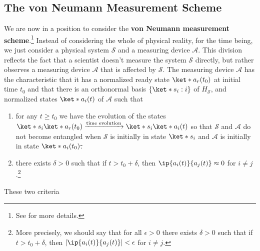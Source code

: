 \documentclass[12pt]{report}
\providecommand{\DIFadd}[1]{{\protect\color{blue}\uwave{#1}}} %
\providecommand{\DIFdel}[1]{{\protect\color{red}\sout{#1}}}                      %
\providecommand{\DIFaddbegin}{} %
\providecommand{\DIFaddend}{} %
\providecommand{\DIFdelbegin}{} %
\providecommand{\DIFdelend}{} %
\begin{document}
    
    \subsection{The von Neumann Measurement Scheme}\label{vonNeumannMeasurement}
    \addtocounter{footnote}{-1}
    \addtocounter{footnote}{1}

    We are now in a position to consider the \textbf{von Neumann measurement scheme}.\footnote{See \cite[50-53]{Schlosshauer} for more details.} Instead of considering the whole of physical reality, for the time being, we just consider a physical system $\mathcal{S}$ and a measuring device $\mathcal{A}$.  %
%
    This division reflects the fact that a scientist doesn't measure the system $\mathcal{S}$ directly, but rather observes a measuring device $\mathcal{A}$ that is affected by $\mathcal{S}$. The measuring device $\mathcal{A}$ has the characteristic that it has a normalized ready state $\ket*{a_r(t_0)}$   %
%
    at initial time $t_0$ and that there is an orthonormal basis $\{\ket*{s_i}:i\}$ of $H_\mathcal{S}$, and normalized states $\ket*{a_i(t)}$ of $\mathcal{A}$ such that
    \begin{enumerate}[noitemsep, nosep, topsep=0pt] 
    \item for any $t\geq t_0$ we have the evolution of the states \label{vonNeumannMeasurement1}
    $\ket*{s_i}\ket*{a_r(t_0)}\xrightarrow{\text{time evolution}}\ket*{s_i}\ket*{a_i(t)}$ so that $\mathcal{S}$ and $\mathcal{A}$ do not become entangled when $\mathcal{S}$ is initially in state $\ket*{s_i}$ and $\mathcal{A}$ is initially in state $\ket*{a_i(t_0)}$\DIFdelbegin \DIFdel{.
    }\DIFdelend \DIFaddbegin \DIFadd{, and
    }\DIFaddend \item \label{vonNeumannMeasurement2} there exists $\delta>0$ such that if $t> t_0+\delta$, then $\ip{a_i(t)}{a_j(t)}\approx 0$ %
     for $i\neq j$.\footnote{\label{approx}More precisely, we should say that for all $\epsilon >0$ there exists $\delta>0$ such that if $t> t_0+\delta$, then $|\ip{a_i(t)}{a_j(t)}|<\epsilon$ for $i\neq j$.}
    \end{enumerate}
    These two criteria    %
%
\end{document}
